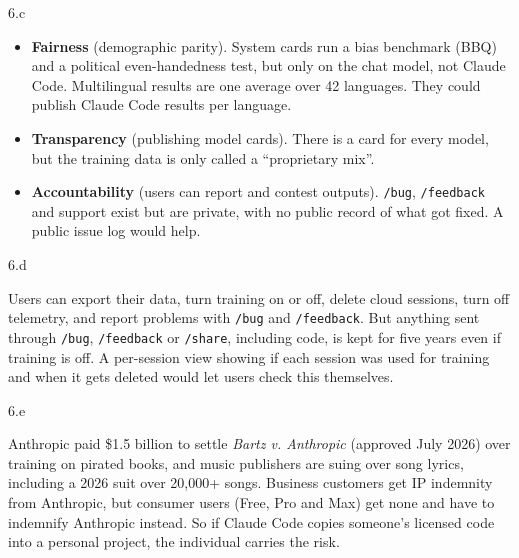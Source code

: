 \LARGE
6.c
\normalsize

\begin{answer}
  \begin{itemize}
    \item \textbf{Fairness} (demographic parity). System cards run a bias benchmark (BBQ) and a
    political even-handedness test, but only on the chat model, not Claude Code. Multilingual results
    are one average over 42 languages. They could publish Claude Code results per language.
    \item \textbf{Transparency} (publishing model cards). There is a card for every model, but the
    training data is only called a ``proprietary mix''.
    \item \textbf{Accountability} (users can report and contest outputs). \texttt{/bug},
    \texttt{/feedback} and support exist but are private, with no public record of what got fixed. A
    public issue log would help.
  \end{itemize}
\end{answer}

\LARGE
6.d
\normalsize

\begin{answer}
  Users can export their data, turn training on or off, delete cloud sessions, turn off telemetry, and
  report problems with \texttt{/bug} and \texttt{/feedback}. But anything sent through \texttt{/bug},
  \texttt{/feedback} or \texttt{/share}, including code, is kept for five years even if training is
  off. A per-session view showing if each session was used for training and when it gets deleted
  would let users check this themselves.
\end{answer}

\LARGE
6.e
\normalsize

\begin{answer}
  Anthropic paid \$1.5 billion to settle \textit{Bartz v. Anthropic} (approved July 2026) over
  training on pirated books, and music publishers are suing over song lyrics, including a 2026 suit
  over 20,000+ songs. Business customers get IP indemnity from Anthropic, but consumer users (Free,
  Pro and Max) get none and have to indemnify Anthropic instead. So if Claude Code copies someone's
  licensed code into a personal project, the individual carries the risk.
\end{answer}
\clearpage


